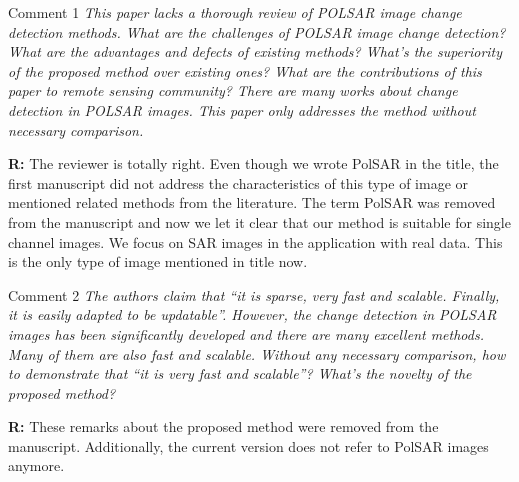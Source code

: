 \documentclass[11pt]{report}
\begin{document}
\medskip
\begin{mybox}{Comment 1}
\textit{This paper lacks a thorough review of POLSAR image change detection methods. What are the challenges of
POLSAR image change detection? What are the advantages and defects of existing methods? What’s the superiority of
the proposed method over existing ones? What are the contributions of this paper to remote sensing community? There
are many works about change detection in POLSAR images. This paper only addresses the method without necessary
comparison.}

\medskip

\textbf{R:} The reviewer is totally right. Even though we wrote PolSAR in the title, the first manuscript did not address the characteristics of this type of image or mentioned related methods from the literature. The term PolSAR was removed from the manuscript and now we let it clear that our method is suitable for single channel images. We focus on SAR images in the application with real data. This is the only type of image mentioned in title now.

\medskip


\end{mybox}

\vspace{0.3cm}

\medskip
\begin{mybox}{Comment 2}
\textit{The authors claim that “it is sparse, very fast and scalable. Finally, it is easily adapted to be updatable”. However, the
change detection in POLSAR images has been significantly developed and there are many excellent methods. Many of
them are also fast and scalable. Without any necessary comparison, how to demonstrate that “it is very fast and scalable”? What’s the novelty of the proposed method?}

\medskip

\textbf{R:} These remarks about the proposed method were removed from the manuscript. Additionally, the current version does not refer to PolSAR images anymore.

\medskip

\end{mybox}

\vspace{0.3cm}
\end{document}
